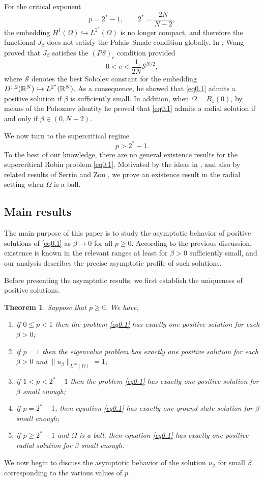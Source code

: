\documentclass[12pt,reqno]{amsart}
\numberwithin{equation}{section}
\newtheorem{theorem}{Theorem}[section]
\theoremstyle{definition}
\def\R{{\Bbb R}}
\begin{document}
For the critical exponent
\[
p=2^*-1,\qquad 2^*=\frac{2N}{N-2},
\]
the embedding $H^1(\Omega)\hookrightarrow L^{2^*}(\Omega)$ is no longer compact, and therefore the functional $J_\beta$ does not satisfy the Palais--Smale condition globally. In \cite{W}, Wang proved that $J_\beta$ satisfies the $(PS)_c$ condition provided
\[
0<c<\frac{1}{2N}\mathcal{S}^{N/2},
\]
where $\mathcal{S}$ denotes the best Sobolev constant for the embedding $D^{1,2}(\R^N)\hookrightarrow L^{2^*}(\R^N)$. As a consequence, he showed that \eqref{eq0.1} admits a positive solution if $\beta$ is sufficiently small. In addition, when $\Omega=B_1(0)$, by means of the Pohozaev identity he proved that \eqref{eq0.1} admits a radial solution if and only if $\beta\in(0,N-2)$.

We now turn to the supercritical regime
\[
p>2^*-1.
\]
To the best of our knowledge, there are no general existence results for the supercritical Robin problem \eqref{eq0.1}. Motivated by the ideas in \cite{W}, and also by related results of Serrin and Zou \cite{SZ}, we prove an existence result in the radial setting when $\Omega$ is a ball.

\subsection{Main results}
The main purpose of this paper is to study the asymptotic behavior of positive solutions of \eqref{eq0.1} as $\beta\to0$ for all $p\ge0$. According to the previous discussion, existence is known in the relevant ranges at least for $\beta>0$ sufficiently small, and our analysis describes the precise asymptotic profile of such solutions.

Before presenting the asymptotic results, we first establish the uniqueness of positive solutions.  
\begin{theorem}\label{Theorem0.1}
Suppose that $p\ge 0$. We have,
\begin{enumerate}
\item  if $0\le p<1$ then the problem \eqref{eq0.1} has exactly one positive solution for each $\beta>0$;
\item if $p=1$ then the eigenvalue problem has  exactly one positive solution for  each $\beta>0$ and $\|u_\beta\|_{L^\infty(\Omega)}=1$;
\item if $1<p<2^*-1$ then the problem \eqref{eq0.1} has exactly one positive solution for $\beta$ small enough;
\item if $p=2^*-1$, then equation \eqref{eq0.1} has exactly  one ground state solution for $\beta$ small enough;
\item  if $p\ge2^*-1$ and $\Omega$ is a ball, then equation \eqref{eq0.1} has exactly  one positive radial solution for $\beta$ small enough.
\end{enumerate}
\end{theorem}
We now begin to discuss the asymptotic behavior of the solution $u_\beta$ for small $\beta$ corresponding to the various values of $p$.
\end{document}
